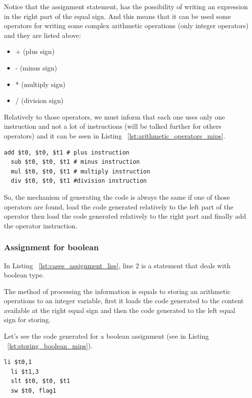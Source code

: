 \documentclass[
  oneside,
  11pt, a4paper,
  footinclude=true,
  headinclude=true,
  cleardoublepage=empty
]{scrbook}
\begin{document}
Notice that the assignment statement, has the possibility of writing an expression in the right part of the equal sign.
And this means that it can be used some operators for writing some complex arithmetic operations (only integer operators) and they are listed above:

\begin{itemize}
\item + (plus sign)
\item - (minus sign)
\item * (multiply sign)
\item / (division sign)
\end{itemize}

Relatively to those operators, we must inform that each one uses only one instruction and not a lot of instructions (will be talked further for others operators) and it can be seen in Listing ~\ref{lst:arithmetic_operators_mips}.

\begin{lstlisting}[caption={Code generated for arithmetic operators},label={lst:arithmetic_operators_mips}]
  add $t0, $t0, $t1 # plus instruction
  sub $t0, $t0, $t1 # minus instruction
  mul $t0, $t0, $t1 # multiply instruction
  div $t0, $t0, $t1 #division instruction
\end{lstlisting}

So, the mechanism of generating the code is always the same if one of those operators are found, load the code generated relatively to the left part of the operator then load the code generated relatively to the right part and finally add the operator instruction.

\subsubsection{Assignment for boolean}

In Listing ~\ref{lst:cases_assignment_liss}, line 2 is a statement that deals with boolean type.

The method of processing the information is equals to storing an arithmetic operations to an integer variable, first it loads the code generated to the content available at the right equal sign and then the code generated to the left equal sign for storing.

Let's see the code generated for a boolean assignment (see in Listing ~\ref{lst:storing_boolean_mips}).

\begin{lstlisting}[caption={Code generated for line 2 of  Listing ~\ref{lst:cases_assignment_liss}},label={lst:storing_boolean_mips}]
  li $t0,1		
  li $t1,3		
  slt $t0, $t0, $t1	
  sw $t0, flag1		
\end{lstlisting}
\end{document}
